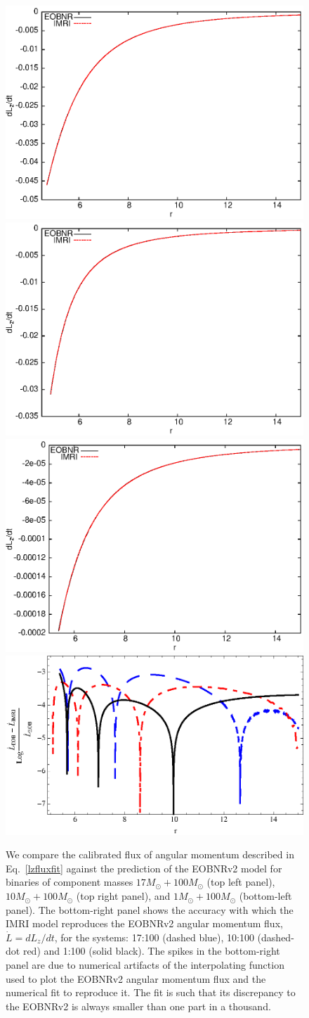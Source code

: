 \begin{figure}%
\includegraphics[height=0.35\textwidth,  clip]{figures/insimri/lzdotp17100}
\includegraphics[height=0.35\textwidth,  clip]{figures/insimri/lzdotp10100}
\includegraphics[height=0.35\textwidth,  clip]{figures/insimri/lzdotp1100}
\includegraphics[height=0.35\textwidth,  clip]{figures/insimri/facc}
\caption{We compare the calibrated flux of angular momentum described in Eq.~\eqref{lzfluxfit} against the prediction of the EOBNRv2 model for binaries of component masses \(17M_{\odot} + 100M_{\odot}\) (top left panel),  \(10M_{\odot} + 100M_{\odot}\) (top right panel), and \(1M_{\odot} + 100M_{\odot}\) (bottom-left panel). The bottom-right panel shows the accuracy with which the IMRI model reproduces the EOBNRv2 angular momentum flux, \(\dot{L}=dL_z/dt\), for the systems: 17:100 (dashed blue), 10:100 (dashed-dot red) and 1:100 (solid black). The spikes in the bottom-right panel are due to numerical artifacts of the interpolating function used to plot the EOBNRv2 angular momentum flux and the numerical fit to reproduce it. The fit is such that its discrepancy to the EOBNRv2  is always smaller than one part in a thousand.}
\label{fluxfitlight}
\end{figure}


